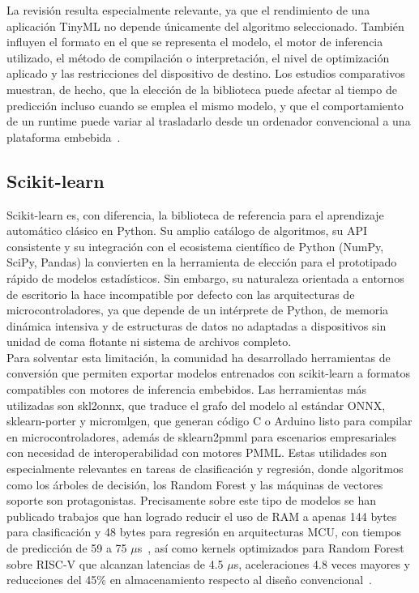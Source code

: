 \documentclass[a4paper,12pt,twoside,final]{book}
\begin{document}
La revisión resulta especialmente relevante, ya que el rendimiento de una aplicación TinyML no depende únicamente
del algoritmo seleccionado. También influyen el formato en el que se representa el modelo, el motor de inferencia
utilizado, el método de compilación o interpretación, el nivel de optimización aplicado y las restricciones del
dispositivo de destino. Los estudios comparativos muestran, de hecho, que la elección de la biblioteca puede afectar
al tiempo de predicción incluso cuando se emplea el mismo modelo, y que el comportamiento de un runtime puede variar
al trasladarlo desde un ordenador convencional a una plataforma embebida~\cite{vicente2023fedcsis}.

\subsection{Scikit-learn}
Scikit-learn es, con diferencia, la biblioteca de referencia para el aprendizaje automático clásico en Python. Su
amplio catálogo de algoritmos, su API consistente y su integración con el ecosistema científico de Python (NumPy,
SciPy, Pandas) la convierten en la herramienta de elección para el prototipado rápido de modelos estadísticos. Sin
embargo, su naturaleza orientada a entornos de escritorio la hace incompatible por defecto con las arquitecturas de
microcontroladores, ya que depende de un intérprete de Python, de memoria dinámica intensiva y de estructuras
de datos no adaptadas a dispositivos sin unidad de coma flotante ni sistema de archivos completo.\\

Para solventar esta limitación, la comunidad ha desarrollado herramientas de conversión que permiten exportar
modelos entrenados con scikit-learn a formatos compatibles con motores de inferencia embebidos. Las herramientas más
utilizadas son skl2onnx, que traduce el grafo del modelo al estándar ONNX, sklearn-porter y micromlgen, que generan
código C o Arduino listo para compilar en microcontroladores, además de sklearn2pmml para escenarios empresariales
con necesidad de interoperabilidad con motores PMML. Estas utilidades son especialmente relevantes en tareas de
clasificación y regresión, donde algoritmos como los árboles de decisión, los Random Forest y las máquinas de
vectores soporte son protagonistas. Precisamente sobre este tipo de modelos se han publicado trabajos que han
logrado reducir el uso de RAM a apenas 144 bytes para clasificación y 48 bytes para regresión en arquitecturas MCU,
con tiempos de predicción de 59 a 75 $\mu$s~\cite{beaurivage2026ieeeles}, así como kernels optimizados para Random
Forest sobre RISC-V que alcanzan latencias de 4.5 $\mu$s, aceleraciones 4.8 veces mayores y reducciones del 45\% en
almacenamiento respecto al diseño convencional~\cite{tabanelli2022ieeetcad}.
\end{document}
